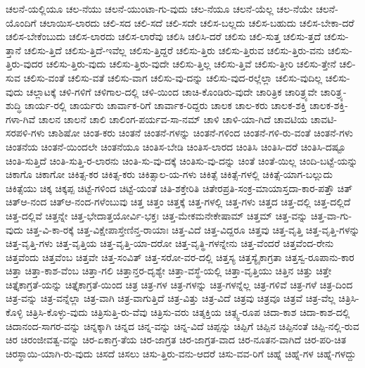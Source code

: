 {ಚಲನೆ-ಯಲ್ಲಿಯೂ
ಚಲ-ನೆಯು
ಚಲನೆ-ಯುಂಟಾ-ಗು-ವುದು
ಚಲ-ನೆಯೂ
ಚಲನೆ-ಯೆಲ್ಲ
ಚಲ-ನೆಯೇ
ಚಲನೆ-ಯೊಂದಿಗೆ
ಚಲಾಯಿಸ-ಲಾರದು
ಚಲಿ-ಸದ
ಚಲಿ-ಸದೆ
ಚಲಿ-ಸದೇ
ಚಲಿಸ-ಬಲ್ಲದು
ಚಲಿಸ-ಬಹುದು
ಚಲಿಸ-ಬೇಕಾ-ದರೆ
ಚಲಿಸ-ಬೇಕೆಂಬುದು
ಚಲಿಸ-ಲಾರದು
ಚಲಿಸ-ಲಾರೆವು
ಚಲಿಸಿ
ಚಲಿಸಿ-ದರೆ
ಚಲಿಸು
ಚಲಿ-ಸುತ್ತ
ಚಲಿಸು-ತ್ತದೆ
ಚಲಿಸು-ತ್ತಾನೆ
ಚಲಿಸು-ತ್ತಿದೆ
ಚಲಿಸು-ತ್ತಿದೆ-ಇವೆಲ್ಲ
ಚಲಿಸು-ತ್ತಿದ್ದರೆ
ಚಲಿಸು-ತ್ತಿರು
ಚಲಿಸು-ತ್ತಿರುವ
ಚಲಿಸು-ತ್ತಿರು-ವನು
ಚಲಿಸು-ತ್ತಿರು-ವುದರ
ಚಲಿಸು-ತ್ತಿರು-ವುದು
ಚಲಿಸು-ತ್ತಿರು-ವುದೇ
ಚಲಿಸು-ತ್ತಿಲ್ಲ
ಚಲಿಸು-ತ್ತಿವೆ
ಚಲಿಸು-ತ್ತೀರಿ
ಚಲಿಸು-ತ್ತೇನೆ
ಚಲಿ-ಸುವ
ಚಲಿಸು-ವಂತೆ
ಚಲಿಸು-ವತೆ
ಚಲಿಸು-ವಾಗ
ಚಲಿಸು-ವು-ದನ್ನು
ಚಲಿಸು-ವುದ-ರಲ್ಲೆಲ್ಲಾ
ಚಲಿಸು-ವುದಿಲ್ಲ
ಚಲಿಸು-ವುದು
ಚಲ್ಲಾಟಕ್ಕೆ
ಚಳಿ-ಗಳಿಗೆ
ಚಳಿಗಾಲ-ದಲ್ಲಿ
ಚಳಿ-ಯಿಂದ
ಚಾಚಿ-ಕೊಂಡಿರು-ವುದೇ
ಚಾರಿತ್ರಿಕ
ಚಾರಿತ್ರ್ಯವೇ
ಚಾರಿತ್ರ್ಯ-ಶುದ್ಧಿ
ಚಾರ್ಯ-ರಲ್ಲಿ
ಚಾರ್ಯರು
ಚಾರ್ವಾಕ-ರಿಗೆ
ಚಾರ್ವಾಕ-ರಿದ್ದರು
ಚಾಲಕ
ಚಾಲ-ಕರು
ಚಾಲಕ-ಶಕ್ತಿ
ಚಾಲಕ-ಶಕ್ತಿ-ಗಳಾ-ಗಿವೆ
ಚಾಲನ
ಚಾಲನೆ
ಚಾಲಿ
ಚಾಲಿಂಗ-ಪರ್ಯವ-ಸಾ-ನಮ್
ಚಾಳಿ
ಚಾಳಿ-ಯಾ-ಗಿದೆ
ಚಾವಟಿಯ
ಚಾವಟಿ-ಸರಪಳಿ-ಗಳು
ಚಾಶಿಷೋ
ಚಿಂತ-ಕರು
ಚಿಂತನೆ
ಚಿಂತನೆ-ಗಳನ್ನು
ಚಿಂತನೆ-ಗಳಿಂದ
ಚಿಂತನೆ-ಗಳಿ-ರು-ವಂತೆ
ಚಿಂತನೆ-ಗಳು
ಚಿಂತನೆಯ
ಚಿಂತನೆ-ಯಿಂದಲೇ
ಚಿಂತನೆಯೂ
ಚಿಂತಿಸ-ಬೇಡಿ
ಚಿಂತಿಸ-ಲಾರದ
ಚಿಂತಿಸಿ
ಚಿಂತಿಸಿ-ದರೆ
ಚಿಂತಿಸಿ-ದಷ್ಟೂ
ಚಿಂತಿ-ಸುತ್ತಿದೆ
ಚಿಂತಿ-ಸುತ್ತಿ-ರ-ಲಾರನು
ಚಿಂತಿ-ಸು-ವು-ದಕ್ಕೆ
ಚಿಂತಿಸು-ವು-ದನ್ನು
ಚಿಂತೆ
ಚಿಂತೆ-ಯಿಲ್ಲ
ಚಿಂದಿ-ಬಟ್ಟೆ-ಯನ್ನು
ಚಿಕಾಗೊ
ಚಿಕಾಗೋ
ಚಿಕಿತ್ಸ-ಕರ
ಚಿಕಿತ್ಸ-ಕರು
ಚಿಕಿತ್ಸಾಲ-ಯ-ಗಳು
ಚಿಕಿತ್ಸೆ
ಚಿಕಿತ್ಸೆ-ಗಳಲ್ಲಿ
ಚಿಕಿತ್ಸೆ-ಯಾಗ-ಬಲ್ಲುದು
ಚಿಕಿತ್ಸೆಯು
ಚಿಕ್ಕ
ಚಿಕ್ಕಪ್ಪ
ಚಿಟ್ಟೆ-ಗಳಿಂದ
ಚಿಟ್ಟೆ-ಯಂತೆ
ಚಿತಿ-ಶಕ್ತೇರಿತಿ
ಚಿತೇರಪ್ರತಿ-ಸಂಕ್ರ-ಮಾಯಾಸ್ತದಾ-ಕಾರ-ಪತ್ತೌ
ಚಿತ್
ಚಿತ್ಆ-ನಂದ
ಚಿತ್ಆ-ನಂದ-ಗಳೆಂಬುವು
ಚಿತ್ತ
ಚಿತ್ತಂ
ಚಿತ್ತಕ್ಕೆ
ಚಿತ್ತ-ಗಳಲ್ಲಿ
ಚಿತ್ತ-ಗಳು
ಚಿತ್ತದ
ಚಿತ್ತ-ದಲ್ಲಿ
ಚಿತ್ತ-ದಲ್ಲಿದೆ
ಚಿತ್ತ-ದಲ್ಲಿವೆ
ಚಿತ್ತನ್ನೇ
ಚಿತ್ತ-ಭೇದಾತ್ತಯೋರ್ವಿ-ಭಕ್ತಃ
ಚಿತ್ತ-ಮೇಕಮನೇಕೇಷಾಮ್
ಚಿತ್ತಮ್
ಚಿತ್ತ-ವನ್ನು
ಚಿತ್ತ-ವಾ-ಗು-ವುದು
ಚಿತ್ತ-ವಿ-ಕಾ-ರಕ್ಕೆ
ಚಿತ್ತ-ವಿಕ್ಷೇಪಾಸ್ತೇಣಿನ್ತ-ರಾಯಾಃ
ಚಿತ್ತ-ವಿದೆ
ಚಿತ್ತ-ವಿದ್ದರೂ
ಚಿತ್ತವು
ಚಿತ್ತ-ವೃತ್ತಿ
ಚಿತ್ತ-ವೃತ್ತಿ-ಗಳನ್ನು
ಚಿತ್ತ-ವೃತ್ತಿ-ಗಳು
ಚಿತ್ತ-ವೃತ್ತಿಯ
ಚಿತ್ತ-ವೃತ್ತಿ-ಯಾ-ದರೋ
ಚಿತ್ತ-ವೃತ್ಥಿ-ಗಳನ್ನೇನು
ಚಿತ್ತ-ವೆಂದರೆ
ಚಿತ್ತವೆಂದ-ರೇನು
ಚಿತ್ತವೆಂದು
ಚಿತ್ತವೆಂಬ
ಚಿತ್ತವೇ
ಚಿತ್ತ-ಸಂವಿತ್
ಚಿತ್ತ-ಸರೋ-ವರ-ದಲ್ಲಿ
ಚಿತ್ತಸ್ಯ
ಚಿತ್ತಸ್ಯೈಕಾಗ್ರತಾ
ಚಿತ್ತಸ್ವ-ರೂಪಾನು-ಕಾರ
ಚಿತ್ತಾ
ಚಿತ್ತಾ-ಕಾಶ-ವೆಂಬ
ಚಿತ್ತಾ-ಗಲಿ
ಚಿತ್ತಾನ್ತರ-ದೃಶ್ಯೇ
ಚಿತ್ತಾ-ವಸ್ಥೆ-ಯಲ್ಲಿ
ಚಿತ್ತಾ-ವೃತ್ತಿಯು
ಚಿತ್ತಿನ
ಚಿತ್ತು
ಚಿತ್ತೇ
ಚಿತ್ತೈಕಾಗ್ರತೆ-ಯನ್ನು
ಚಿತ್ತೈಕಾಗ್ರತೆ-ಯಿಂದ
ಚಿತ್ರ
ಚಿತ್ರ-ಗಳ
ಚಿತ್ರ-ಗಳನ್ನು
ಚಿತ್ರ-ಗಳನ್ನೆಲ್ಲ
ಚಿತ್ರ-ಗಳಿವೆ
ಚಿತ್ರ-ಗಳೆ
ಚಿತ್ರ-ದಿಂದ
ಚಿತ್ರ-ವನ್ನು
ಚಿತ್ರ-ವನ್ನೆಲ್ಲಾ
ಚಿತ್ರ-ವಾಗಿ
ಚಿತ್ರ-ವಾಗುತ್ತಿದೆ
ಚಿತ್ರ-ವಿತ್ತು
ಚಿತ್ರ-ವಿದೆ
ಚಿತ್ರವು
ಚಿತ್ರವೂ
ಚಿತ್ರವೆ
ಚಿತ್ರ-ವೆಲ್ಲ
ಚಿತ್ರಿಸಿ-ಕೊಳ್ಳಿ
ಚಿತ್ರಿಸಿ-ಕೊಳ್ಳು-ವುದು
ಚಿತ್ರಿಸುತ್ತಿ-ರು-ವೆವು
ಚಿತ್ರಿಸು-ವರು
ಚಿತ್ಶಕ್ತಿಯ
ಚಿತ್ಸ್ವ-ರೂಪ
ಚಿದಾ-ಕಾಶ
ಚಿದಾ-ಕಾಶ-ದಲ್ಲಿ
ಚಿದಾನಂದ-ಸಾಗರ-ವನ್ನು
ಚಿನ್ನಕ್ಕಾಗಿ
ಚಿನ್ನದ
ಚಿನ್ನ-ವನ್ನು
ಚಿನ್ನ-ವಿದೆ
ಚಿಪ್ಪನ್ನು
ಚಿಪ್ಪಿಗೆ
ಚಿಪ್ಪಿನ
ಚಿಪ್ಪಿನಂತೆ
ಚಿಪ್ಪಿ-ನಲ್ಲಿ-ರುವ
ಚಿರ
ಚಿರಂಜೀವತ್ವ-ವನ್ನು
ಚಿರ-ಏಕಾಗ್ರ-ತೆಯ
ಚಿರ-ಜಾಗ್ರತ
ಚಿರ-ಜಾಗ್ರತ-ವಾದ
ಚಿರ-ನೂತನ-ವಾಗಿದೆ
ಚಿರ-ಪರಿ-ಚಿತ
ಚಿರಸ್ಥಾಯಿ-ಯಾಗಿ-ರು-ವುದು
ಚಿಸದೆ
ಚಿಸಲು
ಚಿಸು-ತ್ತಿರು-ವನು-ಆದರೆ
ಚಿಸು-ವವ-ರಿಗೆ
ಚಿಹ್ನೆ
ಚಿಹ್ನೆ-ಗಳ
ಚಿಹ್ನೆ-ಗಳದ್ದು
}
